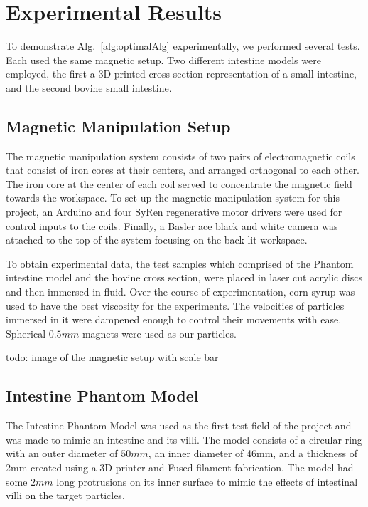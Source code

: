 
\section{Experimental Results}\label{sec:expResults}

To demonstrate Alg.~\ref{alg:optimalAlg} experimentally, we performed several tests.
Each used the same magnetic setup.
 Two different intestine models were employed, the first a 3D-printed cross-section representation of a small intestine, and the second bovine small intestine.
 
 \subsection{Magnetic Manipulation Setup}
 
 The magnetic manipulation system consists of two pairs of electromagnetic coils that consist of iron cores at their centers, and arranged orthogonal to each other. The iron core at the center of each coil served to concentrate the magnetic field towards the workspace. To set up the magnetic manipulation system for this project, an Arduino and four SyRen regenerative motor drivers were used for control inputs to the coils. Finally, a Basler ace black and white camera was attached to the top of the system focusing on the back-lit workspace. 
 
To obtain experimental data, the test samples which comprised of the Phantom intestine model and the bovine cross section, were placed in laser cut acrylic discs and then immersed in fluid. Over the course of experimentation, corn syrup was used to have the best viscosity for the experiments. The velocities of particles immersed in it were dampened enough to control their movements with ease. Spherical $0.5 mm$ magnets were used as our particles.
 

todo: image of the magnetic setup with scale bar


\subsection{Intestine Phantom Model}

The Intestine Phantom Model was used as the first test field of the project and was made to mimic an intestine and its villi. The model consists of a circular ring with an outer diameter of $50 mm$, an inner diameter of 46mm, and a thickness of 2mm created using a 3D printer and Fused filament fabrication. The model had some $2 mm$ long protrusions on its inner surface to mimic the effects of intestinal villi on the target particles. 

